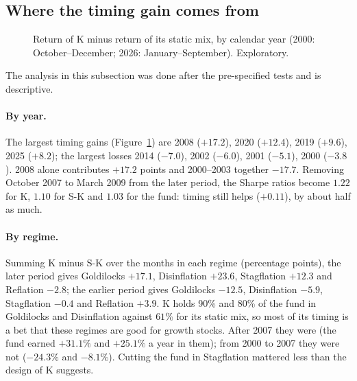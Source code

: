 \documentclass[11pt,a4paper]{article}
\begin{document}
\subsection{Where the timing gain comes from}
\label{sec:where}

\begin{figure}[htbp]
\centering
{}
\caption{Return of K minus return of its static mix, by calendar year (2000: October--December; 2026:
January--September). Exploratory.}
\label{fig:year}
\end{figure}

The analysis in this subsection was done after the pre-specified tests and is descriptive.

\paragraph{By year.} The largest timing gains (Figure~\ref{fig:year}) are 2008 ($+17.2$), 2020 ($+12.4$), 2019 ($+9.6$), 2025 ($+8.2$); the largest losses
2014 ($-7.0$), 2002 ($-6.0$), 2001 ($-5.1$), 2000 ($-3.8$). 2008 alone contributes $+17.2$ points and 2000--2003 together $-17.7$. Removing October 2007 to
March 2009 from the later period, the Sharpe ratios become $1.22$ for K, $1.10$ for S-K and $1.03$ for the
fund: timing still helps ($+0.11$), by about half as much.

\paragraph{By regime.} Summing K minus S-K over the months in each regime (percentage points), the later period
gives Goldilocks $+17.1$, Disinflation $+23.6$, Stagflation $+12.3$ and Reflation $-2.8$; the
earlier period gives Goldilocks $-12.5$, Disinflation $-5.9$, Stagflation $-0.4$ and Reflation
$+3.9$. K holds 90\% and 80\% of the fund in Goldilocks and Disinflation against $61\%$ for its static mix,
so most of its timing is a bet that these regimes are good for growth stocks. After 2007 they were (the fund
earned $+31.1\%$ and $+25.1\%$ a year in them); from 2000 to 2007 they were not ($-24.3\%$ and
$-8.1\%$). Cutting the fund in Stagflation mattered less than the design of K suggests.
\end{document}
